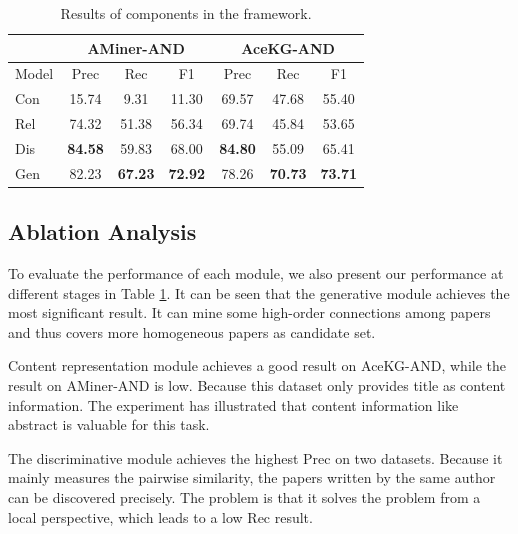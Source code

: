 \documentclass[letterpaper]{article} %
\begin{document}
\begin{table}[t]
\caption{Results of components in the framework.}
\label{tb:contribution}
\begin{center}
\small
\begin{tabular}{l|ccc|ccc}
\toprule[0.1em]
& \multicolumn{3}{c|}{AMiner-AND} & \multicolumn{3}{c}{AceKG-AND}\\
\hline
Model & Prec & Rec & F1& Prec & Rec & F1 \\
\hline
Con & 15.74 & 9.31 & 11.30 & 69.57 & 47.68 & 55.40 \\
Rel & 74.32	& 51.38	& 56.34 & 69.74 & 45.84 & 53.65\\
Dis & \textbf{84.58} & 59.83 & 68.00 & \textbf{84.80} & 55.09 & 65.41\\
Gen & 82.23 & \textbf{67.23} & \textbf{72.92} & 78.26 & \textbf{70.73} & \textbf{73.71}\\
\bottomrule[0.1em]
\end{tabular}
\end{center}
\end{table}

\subsection{Ablation Analysis}
To evaluate the performance of each module, we also present our performance at different stages in Table \ref{tb:contribution}. 
It can be seen that the generative module achieves the most significant result. 
It can mine some high-order connections among papers and thus covers more homogeneous papers as candidate set.

Content representation module achieves a good result on AceKG-AND, 
while the result on AMiner-AND is low. Because this dataset only provides title as content information.
The experiment has illustrated that content information like abstract is valuable for this task.

The discriminative module achieves the highest Prec on two datasets. Because it mainly measures the pairwise similarity, the papers written by the same author
 can be discovered precisely. 
The problem is that it solves the problem from a local perspective, which leads to a low Rec result.
\end{document}
